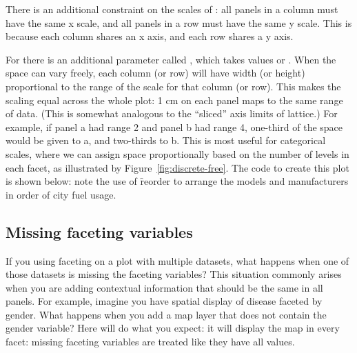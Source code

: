 There is an additional constraint on the scales of : all panels in a column must have the same x scale, and all panels in a row must have the same y scale.  This is because each column shares an x axis, and each row shares a y axis.

For  there is an additional parameter called , which takes values  or .  When the space can vary freely, each column (or row) will have width (or height) proportional to the range of the scale for that column (or row).  This makes the scaling equal across the whole plot: 1 cm on each panel maps to the same range of data.  (This is somewhat analogous to the ``sliced'' axis limits of lattice.)  For example, if panel a had range 2 and panel b had range 4, one-third of the space would be given to a, and two-thirds to b.  This is most useful for categorical scales, where we can assign space proportionally based on the number of levels in each facet, as illustrated by Figure~\ref{fig:discrete-free}.  The code to create this plot is shown below: note the use of \f{reorder} to arrange the models and manufacturers in order of city fuel usage.

% 
%


\subsection{Missing faceting variables}
\label{sub:missing_faceting_columns}

If you using faceting on a plot with multiple datasets, what happens when one of those datasets is missing the faceting variables? This situation commonly arises when you are adding contextual information that should be the same in all panels. For example, imagine you have spatial display of disease faceted by gender. What happens when you add a map layer that does not contain the gender variable?  Here \ggplot will do what you expect: it will display the map in every facet: missing faceting variables are treated like they have all values.

